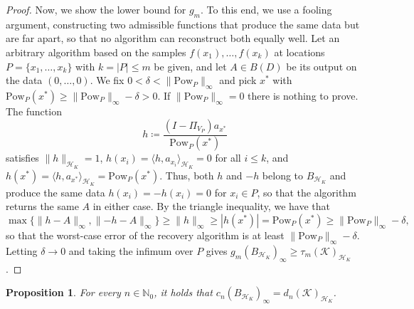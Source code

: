 \documentclass[11pt,reqno, a4paper]{article}
\numberwithin{equation}{section}
\newtheorem{proposition}[theorem]{Proposition}
\newcommand{\N}{\mathbb{N}}
\newcommand{\ip}[2]{\langle #1,#2\rangle}
\newcommand{\norm}[1]{\lVert #1\rVert}
\begin{document}
\begin{proof}
Now, we show the lower bound for $g_m$.
To this end, we use a fooling argument, constructing two admissible functions that produce the same data but are far apart, so that no algorithm can reconstruct both equally well.
Let an arbitrary algorithm based on the samples $f(x_1),\dots,f(x_k)$ at locations $P=\{x_1,\dots,x_k\}$ with $k=|P|\le m$ be given, and let $A\in B(D)$ be its output on the data $(0,\dots,0)$.
We fix $0<\delta<\norm{\mathrm{Pow}_P}_\infty$ and pick $x^*$ with $\mathrm{Pow}_P(x^*)\ge \norm{\mathrm{Pow}_P}_\infty-\delta>0$.
If $\norm{\mathrm{Pow}_P}_\infty=0$ there is nothing to prove.
The function
\begin{equation}
    h \coloneqq \frac{(I-\Pi_{V_P})a_{x^*}}{\mathrm{Pow}_P(x^*)}
\end{equation}
satisfies $\norm{h}_{\mathcal H_K}=1$, $h(x_i)=\ip{h}{a_{x_i}}_{\mathcal H_K}=0$ for all $i\le k$, and $h(x^*)=\ip{h}{a_{x^*}}_{\mathcal H_K}=\mathrm{Pow}_P(x^*)$.
Thus, both $h$ and $-h$ belong to $B_{\mathcal H_K}$ and produce the same data $h(x_i)=-h(x_i)=0$ for $x_i\in P$, so that the
algorithm returns the same $A$ in either case. By the triangle inequality, we have that
\begin{equation}
    \max\bigl\{\norm{h-A}_\infty, \norm{-h-A}_\infty\bigr\} \ge \norm{h}_\infty \ge |h(x^*)| = \mathrm{Pow}_P(x^*)\ge\norm{\mathrm{Pow}_P}_\infty-\delta,
\end{equation}
so that the worst-case error of the recovery algorithm is at least $\norm{\mathrm{Pow}_P}_\infty-\delta$.
Letting $\delta\to0$ and taking the infimum over $P$ gives $g_m(B_{\mathcal H_K})_\infty\ge\tau_m(\mathcal{K})_{\mathcal{H}_K}$.
\end{proof}

\begin{proposition}\label{prop:cn}
For every $n\in\N_0$, it holds that $c_n(B_{\mathcal H_K})_\infty  = d_n(\mathcal{K})_{\mathcal H_K}$.
\end{proposition}
\end{document}
